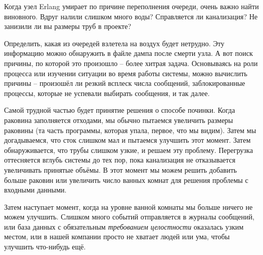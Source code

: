 \documentclass[11pt, oneside]{book}   	%
\begin{document}
Когда узел Erlang умирает по причине переполнения очереди, очень важно найти виновного. Вдруг налили слишком много воды? Справляется ли канализация? Не занизили ли вы размеры труб в проекте?

Определить, какая из очередей взлетела на воздух будет нетрудно. Эту информацию можно обнаружить в файле дампа после смерти узла. А вот поиск причины, по которой это произошло -- более хитрая задача. Основываясь на роли процесса или изучении ситуации во время работы системы, можно вычислить причины -- произошёл ли резкий всплеск числа сообщений, заблокированные процессы, которые не успевали выбирать сообщения, и так далее.

Самой трудной частью будет принятие решения о способе починки. Когда раковина заполняется отходами, мы обычно пытаемся увеличить размеры раковины (та часть программы, которая упала, первое, что мы видим). Затем мы догадываемся, что сток слишком мал и пытаемся улучшить этот момент. Затем обнаруживается, что трубы слишком узкие, и решаем эту проблему. Перегрузка оттесняется вглубь системы до тех пор, пока канализация не отказывается увеличивать принятые объёмы. В этот момент мы можем решить добавить больше раковин или увеличить число ванных комнат для решения проблемы с входными данными.

Затем наступает момент, когда на уровне ванной комнаты мы больше ничего не можем улучшить. Слишком много событий отправляется в журналы сообщений, или база данных с обязательным \emph{требованием целостности} оказалась узким местом, или в нашей компании просто не хватает людей или ума, чтобы улучшить что-нибудь ещё.
\end{document}
